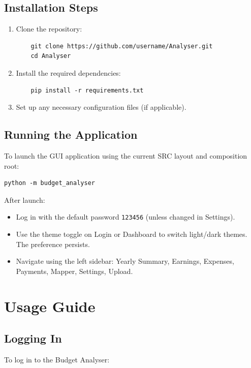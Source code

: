\documentclass[11pt,a4paper]{report}
\begin{document}
\section{Installation Steps}

\begin{enumerate}
    \item Clone the repository:
    \begin{lstlisting}
    git clone https://github.com/username/Analyser.git
    cd Analyser
    \end{lstlisting}
    
    \item Install the required dependencies:
    \begin{lstlisting}
    pip install -r requirements.txt
    \end{lstlisting}
    
    \item Set up any necessary configuration files (if applicable).
\end{enumerate}

\section{Running the Application}

To launch the GUI application using the current SRC layout and composition root:

\begin{lstlisting}
python -m budget_analyser
\end{lstlisting}

After launch:
\begin{itemize}
    \item Log in with the default password \texttt{123456} (unless changed in Settings).
    \item Use the theme toggle on Login or Dashboard to switch light/dark themes. The preference persists.
    \item Navigate using the left sidebar: Yearly Summary, Earnings, Expenses, Payments, Mapper, Settings, Upload.
\end{itemize}

\chapter{Usage Guide}

\section{Logging In}
To log in to the Budget Analyser:
\end{document}
